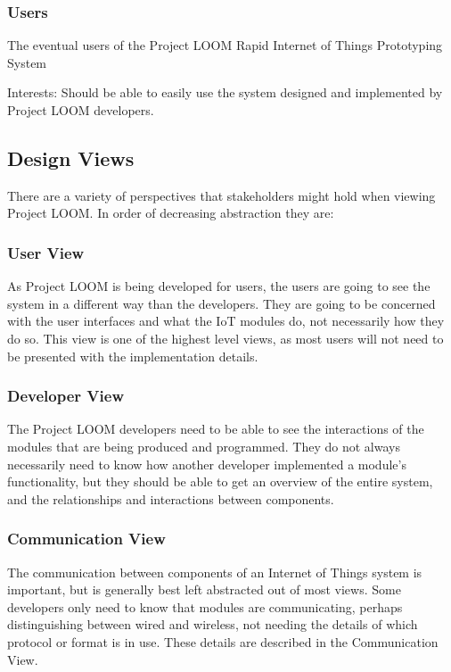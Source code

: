 \documentclass[onecolumn, draftclsnofoot,10pt, compsoc]{IEEEtran}
\begin{document}
\subsubsection{Users}
    The eventual users of the Project LOOM Rapid Internet of Things Prototyping System

    Interests: Should be able to easily use the system designed and implemented by Project LOOM developers.

\subsection{Design Views}
    There are a variety of perspectives that stakeholders might hold when viewing Project LOOM. In order of decreasing abstraction they are:

\subsubsection{User View}
    As Project LOOM is being developed for users, the users are going to see the system in a different way than the developers. They are going to be concerned with the user interfaces and what the IoT modules do, not necessarily how they do so. This view is one of the highest level views, as most users will not need to be presented with the implementation details.

\subsubsection{Developer View}
    The Project LOOM developers need to be able to see the interactions of the modules that are being produced and programmed. They do not always necessarily need to know how another developer implemented a module's functionality, but they should be able to get an overview of the entire system, and the relationships and interactions between components.

\subsubsection{Communication View}
    The communication between components of an Internet of Things system is important, but is generally best left abstracted out of most views. Some developers only need to know that modules are communicating, perhaps distinguishing between wired and wireless, not needing the details of which protocol or format is in use. These details are described in the Communication View.
\end{document}
